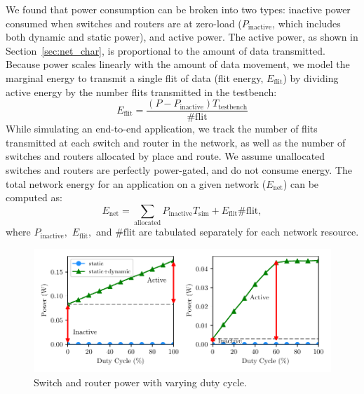 We found that power consumption can be broken into two types: 
inactive power consumed when switches and routers are at zero-load ($P_{\text{inactive}}$, which includes both dynamic and static power),
and active power. The active power, as shown in Section~\ref{sec:net_char}, is proportional to the amount of
data transmitted. 
Because power scales linearly with the amount of data movement, we model the marginal energy to transmit a single flit of data (flit energy, $E_{\text{flit}}$) by dividing active energy by the number flits transmitted in the testbench:
\begin{equation}
  E_{\text{flit}} = \frac{\left(P-P_{\text{inactive}}\right) T_{\text{testbench}}}{\#\text{flit}} 
\end{equation}
While simulating an end-to-end application, we track the number of flits transmitted at each switch and router in the network, as well as the number of switches and routers allocated by place and route. 
We assume unallocated switches and routers are perfectly power-gated, and do not consume energy.
The total network energy for an application on a given network ($E_{\text{net}}$) can be computed as:
\begin{equation}
  E_{\text{net}} = \sum_{\text{allocated}} P_{\text{inactive}} T_{\text{sim}}
  + E_{\text{flit}}  \#\text{flit},
\end{equation}
where $P_{\text{inactive}},$ $E_{\text{flit}},$ and $\#\text{flit}$ are tabulated separately for each network resource.


\begin{figure}
\centering
\includegraphics[width=1\columnwidth]{figs/sweep.pdf}
  \caption{Switch and router power with varying duty cycle.}\label{fig:sweep}
\end{figure}


